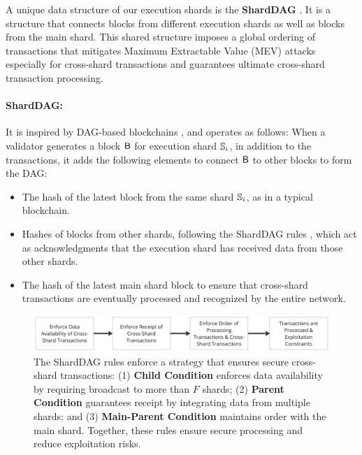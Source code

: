 A unique data structure of our execution shards is the \textbf{ShardDAG}
\cite{sharddagEthResearch}. It is a structure that connects blocks from
different
execution shards as well as blocks from the main shard. This shared
structure imposes a global ordering of transactions that mitigates Maximum
Extractable Value (MEV) attacks \cite{mev1,mev2} especially for
cross-shard
transactions and guarantees ultimate cross-shard transaction processing.

\paragraph{ShardDAG:} It is inspired by DAG-based blockchains
\cite{dagSoK1,dagSoK2}, and operates as
follows:
When a validator generates a block $\mathsf{B}$ for execution shard
$\mathbb{S}_i$, in addition to the transactions, it adds the following
elements to connect $\mathsf{B}$ to other blocks to form the DAG:
\begin{itemize}
	\item The hash of the latest block from the same shard $\mathbb{S}_i$,
	      as in a typical blockchain.
	\item Hashes of blocks from other shards, following the ShardDAG
	      rules \cite{sharddag}, which act as acknowledgments that the
	      execution
	      shard has received data from those other shards.
	\item The hash of the latest main shard block to ensure that
	      cross-shard transactions are eventually processed and
	      recognized by the
	      entire network.
\end{itemize}

\begin{figure}
	\centering
	\includegraphics[width=1\linewidth]{figures/shardDAGStrategy}
	\caption{ The ShardDAG rules enforce a strategy that ensures
		secure cross-shard transactions: (1) \textbf{Child
			Condition} enforces
		data availability by requiring broadcast to more than $F$
		shards; (2)
		\textbf{Parent Condition} guarantees receipt by
		integrating data from
		multiple shards; and (3) \textbf{Main-Parent  Condition}
		maintains order
		with the main shard. Together, these rules ensure secure
		processing and
		reduce exploitation risks.}
	\label{fig:strategy}
\end{figure}

